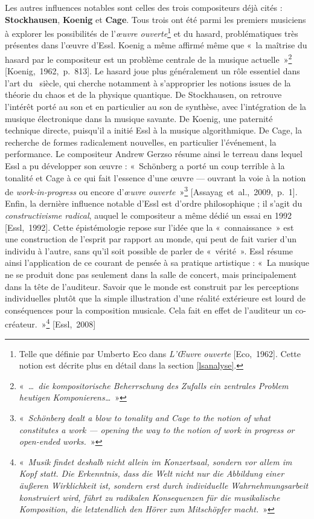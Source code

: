 \documentclass[a4paper,12pt]{article}
\newcommand{\guill}[1]{«~#1~»}
\newcommand{\cicite}[1]{{\footnotesize[#1]}}
\begin{document}
Les autres influences notables sont celles des trois compositeurs déjà cités : \textbf{Stockhausen}, \textbf{Koenig} et \textbf{Cage}. Tous trois ont été parmi les premiers musiciens à explorer les possibilités de l'\emph{œuvre ouverte}\footnote{Telle que définie par Umberto Eco dans \emph{L'Œuvre ouverte} \cicite{Eco,~1962}. Cette notion est décrite plus en détail dans la section \ref{lsanalyse}.} et du hasard, problématiques très présentes dans l'œuvre d'Essl. Koenig a même affirmé même que \guill{la maîtrise du hasard par le compositeur est un problème centrale de la musique actuelle}\footnote{\guill{\emph{\dots~die kompositorische Beherrschung des Zufalls ein zentrales Problem heutigen Komponierens\dots}}} \cicite{Koenig,~1962,~p.~813}. Le hasard joue plus généralement un rôle essentiel dans l'art du \XXe~siècle, qui cherche notamment à s'approprier les notions issues de la théorie du chaos et de la physique quantique. De Stockhausen, on retrouve l'intérêt porté au son et en particulier au son de synthèse, avec l'intégration de la musique électronique dans la musique savante. De Koenig, une paternité technique directe, puisqu'il a initié Essl à la musique algorithmique. De Cage, la recherche de formes radicalement nouvelles, en particulier l'événement, la performance. Le compositeur Andrew Gerzso résume ainsi le terreau dans lequel Essl a pu développer son œuvre : \guill{Schönberg a porté un coup terrible à la tonalité et Cage à ce qui fait l'essence d'une œuvre --- ouvrant la voie à la notion de \emph{work-in-progress} ou encore d'\emph{œuvre ouverte}}\footnote{\guill{\emph{Schönberg dealt a blow to tonality and Cage to the notion of what constitutes a work --- opening the way to the notion of \emph{work in progress} or \emph{open-ended} works.}}} \cicite{Assayag~et~al.,~2009,~p.~1}. \\
Enfin, la dernière influence notable d'Essl est d'ordre philosophique ; il s'agit du \emph{constructivisme radical}, auquel le compositeur a même dédié un essai en 1992 \cicite{Essl,~1992}. Cette épistémologie repose sur l'idée que la \guill{connaissance} est une construction de l'esprit par rapport au monde, qui peut de fait varier d'un individu à l'autre, sans qu'il soit possible de parler de \guill{vérité}. Essl résume ainsi l'application de ce courant de pensée à sa pratique artistique : \guill{La musique ne se produit donc pas seulement dans la salle de concert, mais principalement dans la tête de l'auditeur. Savoir que le monde est construit par les perceptions individuelles plutôt que la simple illustration d'une réalité extérieure est lourd de conséquences pour la composition musicale. Cela fait en effet de l'auditeur un co-créateur.}\footnote{\guill{\emph{Musik findet deshalb nicht allein im Konzertsaal, sondern vor allem im Kopf statt. Die Erkenntnis, dass die Welt nicht nur die Abbildung einer äußeren Wirklichkeit ist, sondern erst durch individuelle Wahrnehmungsarbeit konstruiert wird, führt zu radikalen Konsequenzen für die musikalische Komposition, die letztendlich den Hörer zum Mitschöpfer macht.}}} \cicite{Essl,~2008}
\end{document}
